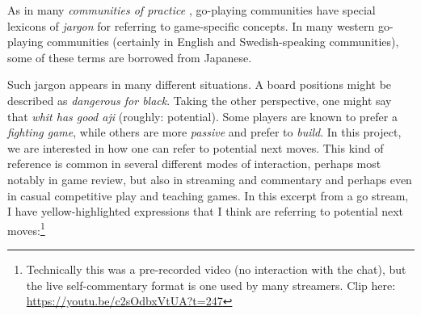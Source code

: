 \documentclass{scrartcl}
\begin{document}
As in many \emph{communities of practice} \citep{gumperzSpeechCommunity1972},
go-playing communities have special lexicons of \emph{jargon} 
for referring to game-specific concepts. 
In many western go-playing communities 
(certainly in English and Swedish-speaking communities), 
some of these terms are borrowed from Japanese.

Such jargon appears in many different situations.
A board positions might be described as \textit{dangerous for black}.
Taking the other perspective, one might say that 
\textit{whit has good aji} (roughly: potential).
Some players are known to prefer a \textit{fighting game},
while others are more \textit{passive} and prefer to \textit{build}.
In this project, we are interested in how one can refer to 
potential next moves.
This kind of reference is common in several different modes of interaction,
perhaps most notably in game review, 
but also in streaming and commentary and 
perhaps even in 
casual competitive play and teaching games.
In this excerpt from a go stream, I have yellow-highlighted expressions that I think
are referring to potential next moves:\footnote{%
  Technically this was a pre-recorded video (no interaction with the chat), 
  but the live self-commentary format is one used by many streamers.
  Clip here: \url{https://youtu.be/c2sOdbxVtUA?t=247}}
\end{document}
